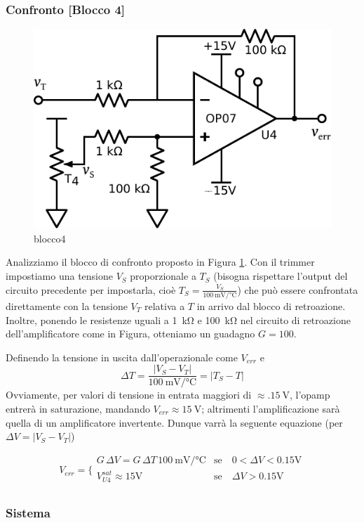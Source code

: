 \subsubsection{Confronto [Blocco 4]}

\begin{figure}
\centering
\includegraphics[width=.33\textwidth]{../E06/latex/P4.pdf}
\caption{blocco4}
\label{fig6:blocco4}
\end{figure}

Analizziamo il blocco di confronto proposto in Figura \ref{fig6:blocco4}.
Con il trimmer impostiamo una tensione $V_{S}$ proporzionale a $T_{S}$ (bisogna rispettare l'output del circuito precedente per impostarla, cioè $T_S = \frac{V_S}{\SI{100}{\milli\volt\per\celsius}}$) che può essere confrontata direttamente con la tensione $V_{T}$ relativa a $T$ in arrivo dal blocco di retroazione.
Inoltre, ponendo le resistenze uguali a \SI{1}{\kilo\ohm} e \SI{100}{\kilo\ohm} nel circuito di retroazione dell'amplificatore come in Figura, otteniamo un guadagno $G=100$.

Definendo la tensione in uscita dall'operazionale come $V_{err}$ e
$$\Delta T = \frac{|V_{S}-V_{T}|}{\SI{100}{\milli\volt}/\si{\celsius}}= | T_S - T | $$
Ovviamente, per valori di tensione in entrata maggiori di $\approx \SI{.15}{\volt}$, l'opamp entrerà in saturazione, mandando $V_{err}\approx \SI{15}{\volt}$; altrimenti l'amplificazione sarà quella di un amplificatore invertente.
Dunque varrà la seguente equazione (per $\Delta V = |V_S - V_T|$)

\begin{equation}
V_{err} = \bigg \{
\begin{array}{rl}
G \,\Delta V = G \,\Delta T \,\SI{100}{\milli\volt}/\si{\celsius}  & \mathrm{se} \quad 0<\Delta V<0.15 \si{\volt} \\
V_{U4}^{sat}\approx 15 \si{\volt} & \mathrm{se} \quad \Delta V>0.15 \si{\volt} \\
\end{array}
\label{eq6:exit_opamp}
\end{equation}

\subsubsection{Sistema}


